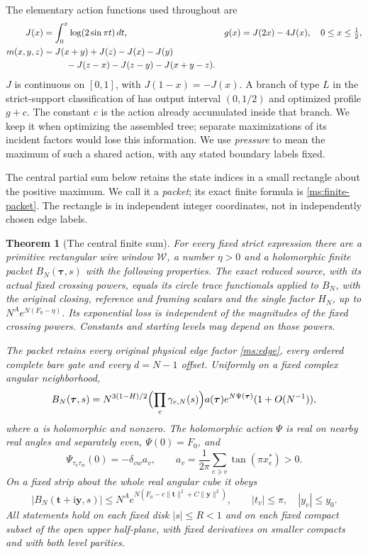 \documentclass[11pt]{article}
\numberwithin{equation}{section}
\newtheorem{theorem}{Theorem}[section]
\theoremstyle{definition}\newtheorem{definition}[theorem]{Definition}
\newcommand{\ii}{\mathrm i}
\begin{document}
The elementary action functions used throughout are
\begin{align}
 J(x)&=\int_0^x\log(2\sin\pi t)\,dt,&
 g(x)&=J(2x)-4J(x),\quad 0\le x\le\tfrac12,\label{ms:actions}\\
 m(x,y,z)&=J(x+y)+J(z)-J(x)-J(y)\notag\\
 &\hspace{9mm}-J(z-x)-J(z-y)-J(x+y-z).
\end{align}
$J$ is continuous on $[0,1]$, with $J(1-x)=-J(x)$. A branch of type $L$ in the strict-support classification of
\cite[Lemma~5.2]{Newton} has output interval $(0,1/2)$ and optimized
profile $g+c$. The constant $c$ is the action already accumulated
inside that branch. We keep it when optimizing the assembled tree;
separate maximizations of its incident factors would lose this
information. We use \emph{pressure} to mean the maximum of such a
shared action, with any stated boundary labels fixed.

The central partial sum below retains the state indices in a small
rectangle about the positive maximum. We call it a \emph{packet};
its exact finite formula is \eqref{ms:finite-packet}. The rectangle
is in independent integer coordinates, not in independently chosen
edge labels.

\begin{theorem}[The central finite sum]\label{ms:packet-main}
For every fixed strict expression there are a primitive rectangular
wire window $\mathcal W$, a number $\eta>0$ and a holomorphic finite
packet $B_N(\boldsymbol\tau,s)$ with the following properties.
The exact reduced source, with its actual fixed crossing powers,
equals its circle trace functionals applied to $B_N$, with the original
closing, reference and framing scalars and the single factor $H_N$,
up to $N^A e^{N(F_0-\eta)}$. Its exponential loss is independent of
the magnitudes of the fixed crossing powers. Constants and starting
levels may depend on those powers.

The packet retains every original physical edge factor
\eqref{ms:edge}, every ordered complete bare gate and every $d=N-1$
offset. Uniformly on a fixed complex angular neighborhood,
\begin{equation}\label{ms:packet-leading}
 B_N(\boldsymbol\tau,s)=N^{3(1-H)/2}
    \Bigl(\prod_e\gamma_{e,N}(s)\Bigr)
    a(\boldsymbol\tau)e^{N\Psi(\boldsymbol\tau)}
    (1+O(N^{-1})),
\end{equation}
where $a$ is holomorphic and nonzero. The holomorphic action $\Psi$ is real on nearby real angles and
separately even, $\Psi(0)=F_0$, and
\[
 \Psi_{\tau_v\tau_w}(0)=-\delta_{vw}a_v,
 \qquad a_v=\frac1{2\pi}\sum_{e\ni v}\tan(\pi x_e^*)>0.
\]
On a fixed strip about the whole real angular cube it obeys
\begin{equation}\label{ms:packet-strip}
 |B_N(\mathbf t+\ii\mathbf y,s)|
 \le N^A e^{N(F_0-c\lVert\mathbf t\rVert^2+C\lVert\mathbf y\rVert^2)},
 \qquad |t_v|\le\pi,\quad |y_v|\le y_0.
\end{equation}
All statements hold on each fixed disk $|s|\le R<1$ and on each
fixed compact subset of the open upper half-plane, with fixed
derivatives on smaller compacts and with both level parities.
\end{theorem}
\end{document}
